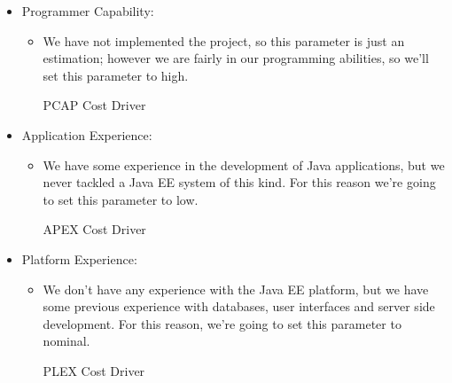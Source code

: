 \begin{itemize}
	\item Programmer Capability: 
	\begin{itemize}
	\item[] We have not implemented the project, so this parameter is just an estimation; however we are fairly in our programming abilities, so we'll set this parameter to high.
	\begin{costdriverstable}{PCAP Cost Driver}
		\hline
	\end{costdriverstable}
	\end{itemize}
\end{itemize}

\begin{itemize}
	\item Application Experience: 
	\begin{itemize}
	\item[] We have some experience in the development of Java applications, but we never tackled a Java EE system of this kind. For this reason we're going to set this parameter to low. 
	\begin{costdriverstable}{APEX Cost Driver}
		\hline
	\end{costdriverstable}
	\end{itemize}
\end{itemize}

\begin{itemize}
	\item Platform Experience: 
	\begin{itemize}
	\item[] We don't have any experience with the Java EE platform, but we have some previous experience with databases, user interfaces and server side development. For this reason, we're going to set this parameter to nominal.
	\begin{costdriverstable}{PLEX Cost Driver}
		\hline
	\end{costdriverstable}
	\end{itemize}
\end{itemize}

